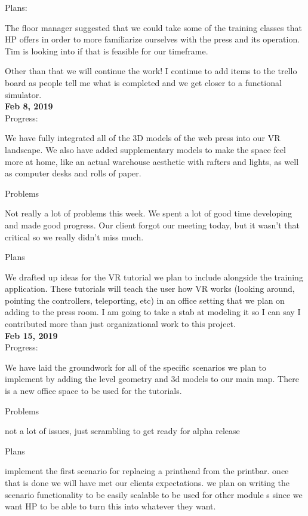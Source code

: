 Plans:

The floor manager suggested that we could take some of the training classes that HP offers in order to more familiarize ourselves with the press and its operation. Tim is looking into if that is feasible for our timeframe.

Other than that we will continue the work! I continue to add items to the trello board as people tell me what is completed and we get closer to a functional simulator.\\

\textbf{Feb 8, 2019}\\
Progress:

We have fully integrated all of the 3D models of the web press into our VR landscape. We also have added supplementary models to make the space feel more at home, like an actual warehouse aesthetic with rafters and lights, as well as computer desks and rolls of paper.

Problems

Not really a lot of problems this week. We spent a lot of good time developing and made good progress. Our client forgot our meeting today, but it wasn't that critical so we really didn't miss much.

Plans

We drafted up ideas for the VR tutorial we plan to include alongside the training application. These tutorials will teach the user how VR works (looking around, pointing the controllers, teleporting, etc) in an office setting that we plan on adding to the press room. I am going to take a stab at modeling it so I can say I contributed more than just organizational work to this project.\\

\textbf{Feb 15, 2019}\\
Progress:

We have laid the groundwork for all of the specific scenarios we plan to implement by adding the level geometry and 3d models to our main map. There is a new office space to be used for the tutorials.

Problems

not a lot of issues, just scrambling to get ready for alpha release

Plans

implement the first scenario for replacing a printhead from the printbar. once that is done we will have met our clients expectations. we plan on writing the scenario functionality to be easily scalable to be used for other module s since we want HP to be able to turn this into whatever they want.

